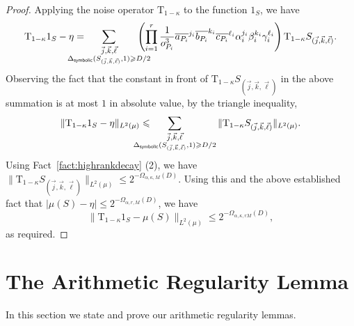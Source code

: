 \documentclass[11pt]{article}
\newcommand\card[1]{\left| {#1} \right|}
\newcommand\norm[1]{\| #1 \|}
\renewcommand\geq{\geqslant}
\renewcommand\leq{\leqslant}
\begin{document}
\begin{proof}
Applying the noise operator $\mathrm{T}_{1-\kappa}$ to the function $1_S$, we have
  \begin{align*}
               \mathrm{T}_{1-\kappa}1_S-\eta =  \hspace{-20pt} \sum_{\substack{\vec{j}, \vec{k}, \vec{\ell} \\\Delta_{{\sf symbolic}}(S_{(\vec{j}, \vec{k}, \vec{\ell})},1)\geq D/2}}\hspace{-15pt}
    \left(  \prod_{i=1}^r \frac{1}{o_{P_i}^3}\overline{a_{P_i}}^{j_i} \overline{b_{P_i}}^{k_i} \overline{c_{P_i}}^{\ell_i} \alpha_i^{j_i}\beta_i^{k_i}\gamma_i^{\ell_i} \right)      \mathrm{T}_{1-\kappa} S_{(\vec{j}, \vec{k}, \vec{\ell})}.
          \end{align*}
Observing the fact that the constant in front of $\mathrm{T}_{1-\kappa} S_{(\vec{j}, \vec{k}, \vec{\ell})}$ in the above summation is at most $1$ in absolute value, by the triangle inequality,
\begin{align*}
               \norm{\mathrm{T}_{1-\kappa}1_S-\eta}_{L^2(\mu)} \leq  \hspace{-20pt} \sum_{\substack{\vec{j}, \vec{k}, \vec{\ell} \\\Delta_{{\sf symbolic}}(S_{(\vec{j}, \vec{k}, \vec{\ell})},1)\geq D/2}} \norm{ \mathrm{T}_{1-\kappa} S_{(\vec{j}, \vec{k}, \vec{\ell})}}_{L^2(\mu)}.
          \end{align*}
 Using Fact~\ref{fact:highrankdecay} (2), we have $\norm{ \mathrm{T}_{1-\kappa} S_{(\vec{j}, \vec{k}, \vec{\ell})}}_{L^2(\mu)} \leq 2^{-\Omega_{\alpha,\kappa, M}(D)}$. Using this and the above established fact that $\card{ \mu(S) -\eta}\leq 2^{-\Omega_{\alpha,r, M}(D)}$, we have
  $$\norm{\mathrm{T}_{1-\kappa}1_S - \mu(S)}_{L^2(\mu)} \leq 2^{-\Omega_{\alpha,\kappa, r M}(D)},$$
  as required.
\end{proof}

\section{The Arithmetic Regularity Lemma}
In this section we state and prove our arithmetic regularity lemmas.
\end{document}
